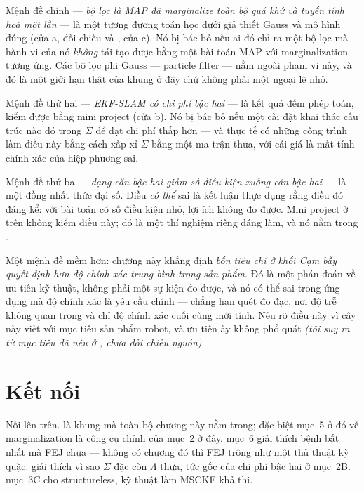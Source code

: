 \documentclass[../../vslam.tex]{subfiles}
\begin{document}
Mệnh đề chính --- \emph{bộ lọc là MAP đã marginalize toàn bộ quá khứ và tuyến tính hoá một lần} --- là một tương đương toán học dưới giả thiết Gauss và mô hình đúng (cửa a, đối chiếu \cite{barfoot2017} và \cite{thrun2005}, cửa c). Nó bị bác bỏ nếu ai đó chỉ ra một bộ lọc mà hành vi của nó \emph{không} tái tạo được bằng một bài toán MAP với marginalization tương ứng. Các bộ lọc phi Gauss --- particle filter --- nằm ngoài phạm vi này, và đó là một giới hạn thật của khung ở đây chứ không phải một ngoại lệ nhỏ.

Mệnh đề thứ hai --- \emph{EKF-SLAM có chi phí bậc hai} --- là kết quả đếm phép toán, kiểm được bằng mini project (cửa b). Nó bị bác bỏ nếu một cài đặt khai thác cấu trúc nào đó trong \(\Sigma\) để đạt chi phí thấp hơn --- và thực tế có những công trình làm điều này bằng cách xấp xỉ \(\Sigma\) bằng một ma trận thưa, với cái giá là mất tính chính xác của hiệp phương sai.

Mệnh đề thứ ba --- \emph{dạng căn bậc hai giảm số điều kiện xuống căn bậc hai} --- là một đồng nhất thức đại số. Điều \emph{có thể} sai là kết luận thực dụng rằng điều đó đáng kể: với bài toán có số điều kiện nhỏ, lợi ích không đo được. Mini project ở trên không kiểm điều này; đó là một thí nghiệm riêng đáng làm, và nó nằm trong .

Một mệnh đề mềm hơn: chương này khẳng định \emph{bốn tiêu chí ở khối \emph{Cạm bẫy} quyết định hơn độ chính xác trung bình trong sản phẩm}. Đó là một phán đoán về ưu tiên kỹ thuật, không phải một sự kiện đo được, và nó có thể sai trong ứng dụng mà độ chính xác là yêu cầu chính --- chẳng hạn quét đo đạc, nơi độ trễ không quan trọng và chỉ độ chính xác cuối cùng mới tính. Nêu rõ điều này vì cây này viết với mục tiêu sản phẩm robot, và ưu tiên ấy không phổ quát \emph{(tôi suy ra từ mục tiêu đã nêu ở , chưa đối chiếu nguồn)}.

\section{Kết nối}

Nối lên trên.  là khung mà toàn bộ chương này nằm trong; đặc biệt mục~5 ở đó về marginalization là công cụ chính của mục~2 ở đây.  mục~6 giải thích bệnh bất nhất mà FEJ chữa --- không có chương đó thì FEJ trông như một thủ thuật kỳ quặc.  giải thích vì sao \(\Sigma\) đặc còn \(\Lambda\) thưa, tức gốc của chi phí bậc hai ở mục~2B.  mục~3C cho structureless, kỹ thuật làm MSCKF khả thi.
\end{document}
